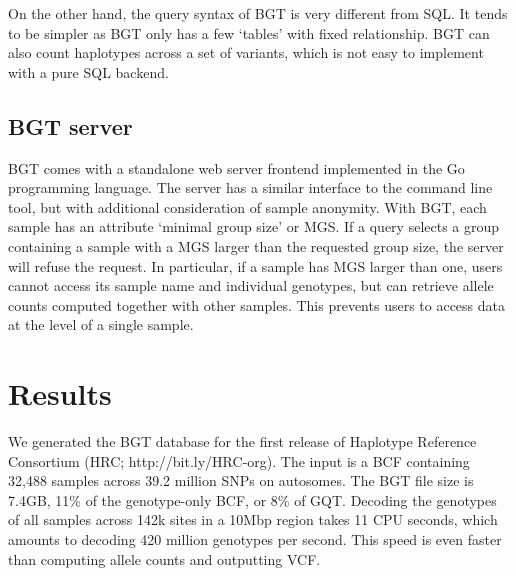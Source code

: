 \documentclass{bioinfo}
\begin{document}
\begin{methods}
On the other hand, the query syntax of BGT is very different from SQL. It tends
to be simpler as BGT only has a few `tables' with fixed relationship. BGT can
also count haplotypes across a set of variants, which is not easy to
implement with a pure SQL backend.

\subsection{BGT server}

BGT comes with a standalone web server frontend implemented in the Go
programming language. The server has a similar interface to the command line
tool, but with additional consideration of sample anonymity. With BGT,
each sample has an attribute `minimal group size' or MGS. If a query selects a
group containing a sample with a MGS larger than the requested group size, the
server will refuse the request. In particular, if a sample has MGS larger than
one, users cannot access its sample name and individual genotypes, but can
retrieve allele counts computed together with other samples. This prevents
users to access data at the level of a single sample.

\end{methods}

\section{Results}

We generated the BGT database for the first release of Haplotype Reference
Consortium (HRC; http://bit.ly/HRC-org). The input is a BCF containing 32,488
samples across 39.2 million SNPs on autosomes. The BGT file size is 7.4GB, 11\%
of the genotype-only BCF, or 8\% of GQT. Decoding the genotypes of all samples
across 142k sites in a 10Mbp region takes 11 CPU seconds, which amounts to
decoding 420 million genotypes per second. This speed is even faster than
computing allele counts and outputting VCF.
\end{document}
